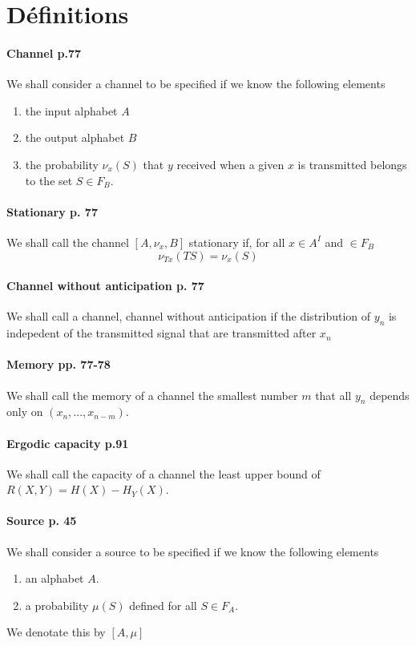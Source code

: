 \documentclass[a4paper,12pt]{article}
\begin{document}
\section{Définitions}

\paragraph{Channel p.77}
	We shall consider a channel to be specified if we 
	know the following elements
	\begin{enumerate}
		\item the input alphabet $A$
		\item the output alphabet $B$
		\item the probability $\nu_x(S)$ that $y$ received 
		      when a given $x$ is transmitted belongs to 
		      the set $S \in F_B$.
	\end{enumerate}

\paragraph{Stationary p. 77}
	We shall call the channel $[A,\nu_x,B]$ stationary if, 
	for all $x\in A^I$ and $\in F_B$
	\[\nu_{Tx}(TS)=\nu_x(S)\]

\paragraph{Channel without anticipation p. 77}
	We shall call a channel, channel without anticipation 
	if the distribution of $y_n$ is indepedent of the transmitted 
	signal that are transmitted  after $x_n$

\paragraph{Memory pp. 77-78}
	We shall call the memory of a channel the smallest number
	$m$ that all $y_n$ depends only on $(x_n, ..., x_{n-m})$.
	
\paragraph{Ergodic capacity p.91}
	We shall call the capacity of a channel the least upper bound
	of $R(X,Y) = H(X)-H_Y(X)$.
	
\paragraph{Source p. 45}
	We shall consider a source to be specified if we 
	know the following elements
	\begin{enumerate}
		\item an alphabet $A$.
		\item a probability $\mu(S)$ defined for all $S\in F_A$.
	\end{enumerate}
	We denotate this by $[A,\mu]$
	
	
\end{document}
